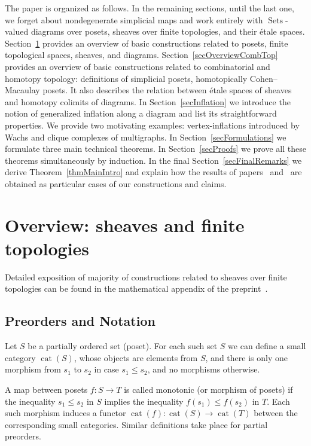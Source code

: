 \documentclass[english,12pt,oneside]{amsproc}
\DeclareMathOperator{\cat}{cat}
\DeclareMathOperator{\Sets}{Sets}
\numberwithin{equation}{section}
\theoremstyle{plain}
\theoremstyle{definition}
\theoremstyle{remark}
\begin{document}
The paper is organized as follows. In the remaining sections, until the last one, we forget about nondegenerate simplicial maps and work entirely with $\Sets$-valued diagrams over posets, sheaves over finite topologies, and their étale spaces. Section~\ref{secOverviewSheaves} provides an overview of basic constructions related to posets, finite topological spaces, sheaves, and diagrams. Section~\ref{secOverviewCombTop} provides an overview of basic constructions related to combinatorial and homotopy topology: definitions of simplicial posets, homotopically Cohen--Macaulay posets. It also describes the relation between étale spaces of sheaves and homotopy colimits of diagrams. In Section~\ref{secInflation} we introduce the notion of generalized inflation along a diagram and list its straightforward properties. We provide two motivating examples: vertex-inflations introduced by Wachs and clique complexes of multigraphs. In Section~\ref{secFormulations} we formulate three main technical theorems. In Section~\ref{secProofs} we prove all these theorems simultaneously by induction. In the final Section~\ref{secFinalRemarks} we derive Theorem~\ref{thmMainIntro} and explain how the results of papers~\cite{Wachs} and~\cite{AyzRukh} are obtained as particular cases of our constructions and claims.

\section{Overview: sheaves and finite topologies}\label{secOverviewSheaves}

Detailed exposition of majority of constructions related to sheaves over finite topologies can be found in the mathematical appendix of the preprint~\cite{AyzSheaves}.

\subsection{Preorders and Notation}

Let $S$ be a partially ordered set (poset). For each such set $S$ we can define a small category $\cat(S)$, whose objects are elements from $S$,  and  there is only one morphism from $s_1$ to $s_2$ in case $s_1\leqslant s_2$, and no morphisms otherwise.

A map between posets $f\colon S\to T$ is called monotonic (or morphism of posets) if the inequality $s_1\leqslant s_2$ in $S$ implies the inequality $f(s_1)\leqslant f(s_2)$ in $T$. Each such morphism induces a functor $\cat(f)\colon \cat(S)\to \cat(T)$ between the corresponding small categories. Similar definitions take place for partial preorders.
\end{document}
